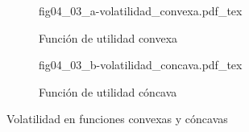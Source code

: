 \begin{figure}[h]
\captionsetup[subfigure]{aboveskip=15pt,belowskip=15pt}
\centering
\begin{subfigure}{.45\textwidth}
  \centering
        \def\svgwidth{\textwidth}
        {fig04_03_a-volatilidad_convexa.pdf_tex}
  \caption{Función de utilidad convexa}
  \label{fig04_03_a-volatilidad_convexa}
\end{subfigure}\hspace{.05\textwidth}
\begin{subfigure}{.45\textwidth}
  \centering
        \def\svgwidth{\textwidth}
        {fig04_03_b-volatilidad_concava.pdf_tex}
  \caption{Función de utilidad cóncava}
  \label{fig04_03_b-volatilidad_concava}
\end{subfigure}
\caption{Volatilidad en funciones convexas y cóncavas}
\label{fig04_03-volatilidad}
\end{figure}